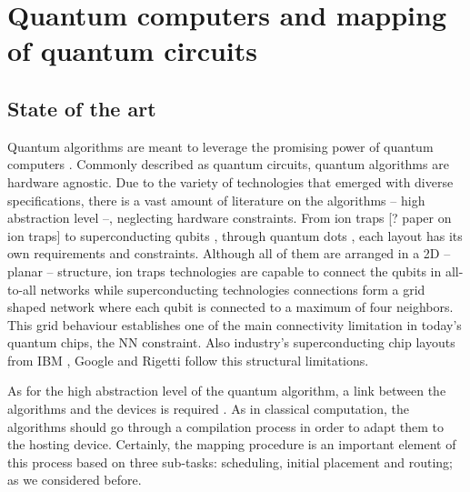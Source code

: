 
\chapter*{Quantum computers and mapping of quantum circuits}
\label{sec:orgc858e12}
\section*{State of the art}
\label{sec:org06022f6}

Quantum algorithms are meant to leverage the promising power of quantum computers \cite{coles18:quant_algor_implem_begin}.
Commonly described as quantum circuits, quantum algorithms are hardware agnostic.
Due to the variety of technologies that emerged with diverse specifications, there is a vast amount of literature on the algorithms -- high abstraction level --, neglecting hardware constraints.
From ion traps [? paper on ion traps] to superconducting qubits \cite{Barends_2014,Versluis_2017}, through quantum dots \cite{Hill_2015,Li_2018}, each layout has its own requirements and constraints.
Although all of them are arranged in a 2D -- planar -- structure, ion traps technologies are capable to connect the qubits in all-to-all networks while superconducting technologies connections form a grid shaped network where each qubit is connected to a maximum of four neighbors.
This grid behaviour establishes one of the main connectivity limitation in today's quantum chips, the NN constraint.
Also industry's superconducting chip layouts from IBM \cite{IBM_QX}, Google \cite{boixo16:charac_quant_suprem_near_term_devic} and Rigetti \cite{Sete_2016} follow this structural limitations.

As for the high abstraction level of the quantum algorithm, a link between the algorithms and the devices is required \cite{Fu_2016}.
As in classical computation, the algorithms should go through a compilation process in order to adapt them to the hosting device.
Certainly, the mapping procedure is an important element of this process based on three sub-tasks: scheduling, initial placement and routing; as we considered before.

